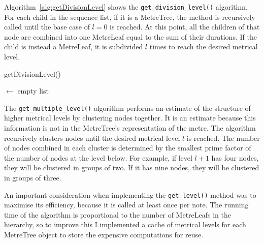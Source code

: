 \documentclass[12pt,twoside,openright]{report}
\begin{document}
Algorithm~\ref{alg:getDivisionLevel} shows the \verb'get_division_level()' algorithm. For each child in the
sequence list, if it is a MetreTree, the method is recursively called until the
base case of $l=0$ is reached. At this point, all the children of that node are
combined into one MetreLeaf equal to the sum of their durations. If the child is
instead a MetreLeaf, it is subdivided $l$ times to reach the desired metrical
level.

\begin{algorithm}[H]

    \caption{getDivisionLevel()}
    \BlankLine

    \NewSequence $\gets$ empty list\;
    \label{alg:getDivisionLevel}
\end{algorithm}

The \verb'get_multiple_level()' algorithm performs an estimate of the structure of
higher metrical levels by clustering nodes together. It is an estimate because this information is not in the
MetreTree's representation of the metre. The algorithm recursively clusters nodes until
the desired metrical level $l$ is reached. The number of nodes combined in each cluster is
determined by the smallest prime factor of the number of nodes at the level below. For
example, if level $l+1$ has four nodes, they will be clustered in groups of two. If it
has nine nodes, they will be clustered in groups of three.

An important consideration when implementing the \verb'get_level()' method was to
maximise its efficiency, because it is called at least once per note. The
running time of the algorithm is proportional to the number of MetreLeafs in the
hierarchy, so to improve this I implemented a cache of metrical levels for each
MetreTree object to store the expensive computations for reuse.
\end{document}
